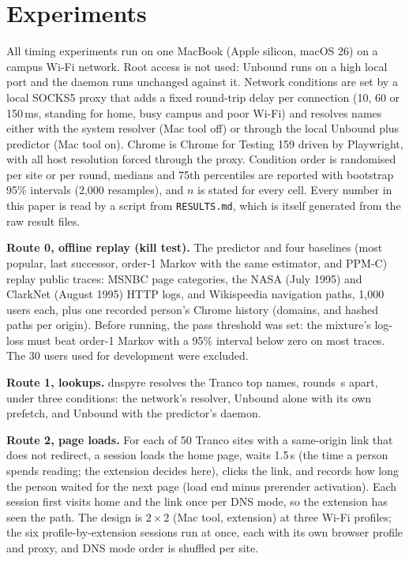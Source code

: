 \section{Experiments}
All timing experiments run on one MacBook (Apple silicon, macOS 26) on a campus Wi-Fi network. Root access is not used: Unbound runs on a high local port and the daemon runs unchanged against it. Network conditions are set by a local SOCKS5 proxy that adds a fixed round-trip delay per connection (10, 60 or 150\,ms, standing for home, busy campus and poor Wi-Fi) and resolves names either with the system resolver (Mac tool off) or through the local Unbound plus predictor (Mac tool on). Chrome is Chrome for Testing 159 driven by Playwright, with all host resolution forced through the proxy. Condition order is randomised per site or per round, medians and 75th percentiles are reported with bootstrap 95\% intervals (2{,}000 resamples), and $n$ is stated for every cell. Every number in this paper is read by a script from \texttt{RESULTS.md}, which is itself generated from the raw result files.

\textbf{Route 0, offline replay (kill test).} The predictor and four baselines (most popular, last successor, order-1 Markov with the same estimator, and PPM-C) replay public traces: MSNBC page categories, the NASA (July 1995) and ClarkNet (August 1995) HTTP logs, and Wikispeedia navigation paths, 1{,}000 users each, plus one recorded person's Chrome history (domains, and hashed paths per origin). Before running, the pass threshold was set: the mixture's log-loss must beat order-1 Markov with a 95\% interval below zero on most traces. The 30 users used for development were excluded.

\textbf{Route 1, lookups.} dnspyre resolves the Tranco top  names,  rounds \,s apart, under three conditions: the network's resolver, Unbound alone with its own prefetch, and Unbound with the predictor's daemon.

\textbf{Route 2, page loads.} For each of 50 Tranco sites with a same-origin link that does not redirect, a session loads the home page, waits 1.5\,s (the time a person spends reading; the extension decides here), clicks the link, and records how long the person waited for the next page (load end minus prerender activation). Each session first visits home and the link once per DNS mode, so the extension has seen the path. The design is $2\times2$ (Mac tool, extension) at three Wi-Fi profiles; the six profile-by-extension sessions run at once, each with its own browser profile and proxy, and DNS mode order is shuffled per site.

